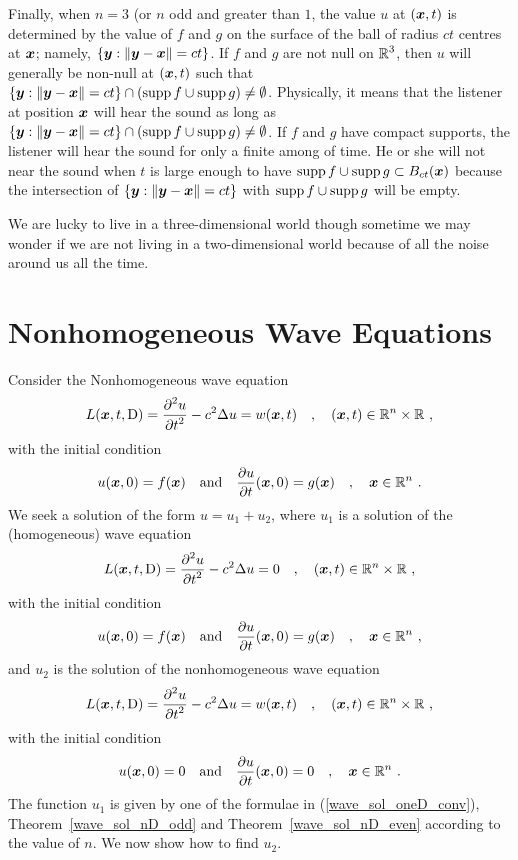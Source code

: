 Finally, when $n=3$ (or $n$ odd and greater than $1$, the value $u$ at
$({\bm{x}},t)$ is determined by the value of $f$ and $g$ on the surface
of the ball of radius $ct$ centres at ${\bm{x}}$; namely,
$\left\{{\bm{y}} : \|{\bm{y}}-{\bm{x}}\| = ct\right\}$.  If $f$ and $g$ are
not null on $\displaystyle \mathbb{R}^3$, then $u$ will generally be non-null at
$({\bm{x}},t)$ such that
$\left\{ {\bm{y}} : \|{\bm{y}}-{\bm{x}}\| = ct \right\} \cap
( \operatorname{supp} f \cup \operatorname{supp} g) \neq \emptyset$.
Physically, it means that the listener at position ${\bm{x}}$ will hear
the sound as long as $\left\{ {\bm{y}} : \|{\bm{y}}-{\bm{x}}\| = ct\right\} \cap
(\operatorname{supp} f \cup \operatorname{supp} g) \neq \emptyset$.
If $f$ and $g$ have compact supports, the listener will hear the
sound for only a finite among of time.  He or she will not near the
sound when $t$ is large enough to have
$\operatorname{supp} f \cup \operatorname{supp} g \subset B_{ct}({\bm{x}})$ because the
intersection of $\left\{ {\bm{y}} : \|{\bm{y}}-{\bm{x}}\| = ct\right\}$
with $\operatorname{supp} f \cup \operatorname{supp} g$ will be empty.

We are lucky to live in a three-dimensional world though sometime we
may wonder if we are not living in a two-dimensional world because of
all the noise around us all the time.


\section{Nonhomogeneous Wave Equations} \label{sectDuhamel}

Consider the Nonhomogeneous wave equation
\[
L({\bm{x}},t,\operatorname{D}) = \frac{\displaystyle \partial^{2}{u}} {\displaystyle \partial t^{2}} - c^2 \Delta u = w({\bm{x}},t) \quad ,
\quad ({\bm{x}},t) \in \mathbb{R}^n \times \mathbb{R} \ ,
\]
with the initial condition
\[
u({\bm{x}}, 0) = f({\bm{x}}) \quad \text{and} \quad
\frac{\partial{u}}{\partial t}({\bm{x}},0) = g({\bm{x}}) \quad , \quad
{\bm{x}} \in \mathbb{R}^n \ .
\]
We seek a solution of the form $u=u_1+u_2$, where $u_1$ is a solution
of the (homogeneous) wave equation
\[
L({\bm{x}},t,\operatorname{D}) = \frac{\displaystyle \partial^{2}{u}} {\displaystyle \partial t^{2}} - c^2 \Delta u = 0 \quad ,
\quad ({\bm{x}},t) \in \mathbb{R}^n \times \mathbb{R} \ ,
\]
with the initial condition
\[
u({\bm{x}}, 0) = f({\bm{x}}) \quad \text{and} \quad
\frac{\partial{u}}{\partial t}({\bm{x}},0) = g({\bm{x}}) \quad , \quad
{\bm{x}} \in \mathbb{R}^n \ ,
\]
and $u_2$ is the solution of the nonhomogeneous wave equation
\begin{equation} \label{wave_nD_inh}
L({\bm{x}},t,\operatorname{D}) = \frac{\displaystyle \partial^{2}{u}} {\displaystyle \partial t^{2}} - c^2 \Delta u = w({\bm{x}},t) \quad ,
\quad ({\bm{x}},t) \in \mathbb{R}^n \times \mathbb{R} \ ,
\end{equation}
with the initial condition
\begin{equation} \label{wave_nD_inh_cond}
u({\bm{x}}, 0) = 0 \quad \text{and} \quad
\frac{\partial{u}}{\partial t}({\bm{x}},0) = 0 \quad , \quad
{\bm{x}} \in \mathbb{R}^n \ .
\end{equation}
The function $u_1$ is given by one of the formulae in
(\ref{wave_sol_oneD_conv}), Theorem~\ref{wave_sol_nD_odd} and
Theorem~\ref{wave_sol_nD_even} according to the value of $n$.
We now show how to find $u_2$.

